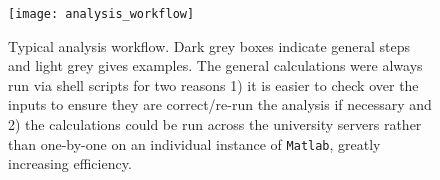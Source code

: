 \documentclass[a4paper,12pt]{report}
\numberwithin{equation}{chapter}
\begin{document}
\begin{figure}[th]
  \centering
    \texttt{[image: analysis\_workflow]}
  \caption[Typical analysis workflow]{Typical analysis workflow. Dark grey boxes indicate general steps and light grey gives examples. The general calculations were always run via shell scripts for two reasons 1) it is easier to check over the inputs to ensure they are correct/re-run the analysis if necessary and 2) the calculations could be run across the university servers rather than one-by-one on an individual instance of \texttt{Matlab}, greatly increasing efficiency.}
  \label{fig:analysis_workflow}
\end{figure}
\end{document}
